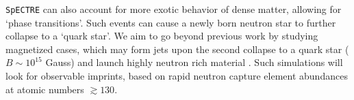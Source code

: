 \documentclass[12pt]{article}
\begin{document}
\texttt{SpECTRE} can also account for more exotic behavior of dense matter, allowing for `phase transitions'.  Such events can cause a newly born neutron star to further collapse to a `quark star'.  We aim to go beyond previous work \citep{zha:2020} by studying magnetized cases, which may form jets upon the second collapse to a quark star ($B\sim10^{15}$ Gauss) and launch highly neutron rich material \citep{halevi:2018}.  Such simulations will look for observable imprints, based on rapid neutron capture element abundances at atomic numbers $\gtrsim 130$.

\renewcommand\bibsection{\section*{References}}
\setlength{\bibsep}{2pt}
\begin{multicols}{2}
{\footnotesize }
\end{multicols}
\end{document}
